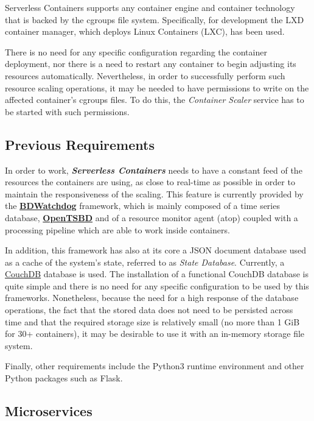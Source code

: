 \documentclass[12pt]{article}
\begin{document}
Serverless Containers supports any container engine and container technology that is backed by the cgroups file system. Specifically, for development the LXD container manager, which deploys Linux Containers (LXC), has been used.

There is no need for any specific configuration regarding the container deployment, nor there is a need to restart any container to begin adjusting its resources automatically. Nevertheless, in order to successfully perform such resource scaling operations, it may be needed to have permissions to write on the affected container's cgroups files. To do this, the \textit{Container Scaler} service has to be started with such permissions.

\subsection{Previous Requirements}

In order to work, \textbf{\textit{Serverless Containers}} needs to have a constant feed of the resources the containers are using, as close to real-time as possible in order to maintain the responsiveness of the scaling. This feature is currently provided by the  \textbf{\href{http://bdwatchdog.dec.udc.es/monitoring/index.html}{BDWatchdog}} framework, which is mainly composed of a time series database, \textbf{\href{http://opentsdb.net/}{OpenTSBD}} and of a resource monitor agent (atop) coupled with a processing pipeline which are able to work inside containers.

In addition, this framework has also at its core a JSON document database used as a cache of the system's state, referred to as \textit{State Database}. Currently, a \href{https://couchdb.apache.org/}{CouchDB} database is used. The installation of a functional CouchDB database is quite simple and there is no need for any specific configuration to be used by this frameworks. Nonetheless, because the need for a high response of the database operations, the fact that the stored data does not need to be persisted across time and that the required storage size is relatively small (no more than 1 GiB for 30+ containers), it may be desirable to use it with an in-memory storage file system.

Finally, other requirements include the Python3 runtime environment and other Python packages such as Flask.

\subsection{Microservices}
\end{document}
